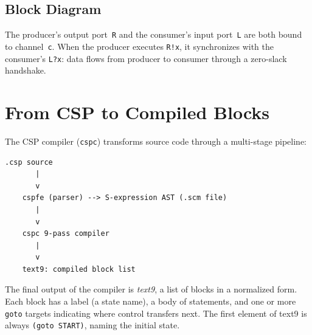 \documentclass[11pt]{article}
\begin{document}
\subsection{Block Diagram}

\begin{center}
\end{center}

The producer's output port~\texttt{R} and the consumer's input
port~\texttt{L} are both bound to channel~\texttt{c}.  When the
producer executes \texttt{R!x}, it synchronizes with the consumer's
\texttt{L?x}: data flows from producer to consumer through a
zero-slack handshake.

\section{From CSP to Compiled Blocks}
\label{sec:compilation}

The CSP compiler (\texttt{cspc}) transforms source code through a
multi-stage pipeline:

\begin{Verbatim}[samepage=true]
  .csp source
       |
       v
    cspfe (parser) --> S-expression AST (.scm file)
       |
       v
    cspc 9-pass compiler
       |
       v
    text9: compiled block list
\end{Verbatim}

The final output of the compiler is \emph{text9}, a list of blocks in
a normalized form.  Each block has a label (a state name), a body of
statements, and one or more \texttt{goto} targets indicating where
control transfers next.  The first element of text9 is always
\texttt{(goto START)}, naming the initial state.

\end{document}

